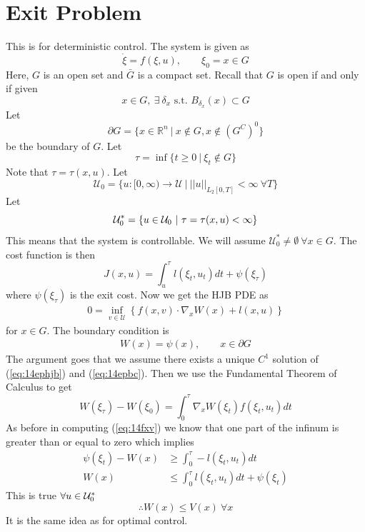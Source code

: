 \section{Exit Problem}
This is for deterministic control. The system is given as
$$\dot{\xi} = f(\xi,u), \qquad \xi_0 = x\in G$$
Here, $G$ is an open set and $\bar{G}$ is a compact set. Recall that $G$ is open if and only if given
$$x\in G, ~\exists~ \delta_x \text{ s.t. } B_{\delta_x}(x)\subset G$$
Let
$$\partial G = \{x\in\mathbb{R}^n ~|~ x\notin G, x\notin(G^C)^0\}$$
be the boundary of $G$. Let
$$\tau = \inf\{t\geq 0 ~|~ \xi_t\notin G\}$$
Note that $\tau=\tau(x,u)$. Let
$$\mathcal{U}_0 = \{u:[0,\infty)\to\mathcal{U} ~|~ ||u||_{L_2[0,T]}<\infty ~\forall T\}$$
Let
$$\mathcal{U}_0^\ast = \{u\in\mathcal{U}_0 ~|~ \tau=\tau(x,u)<\infty\}$$
This means that the system is controllable. We will assume $\mathcal{U}_0^\ast\neq\emptyset ~\forall x\in G$. The cost function is then
$$J(x,u) = \int_u^\tau l(\xi_t,u_t)dt + \psi(\xi_\tau)$$
where $\psi(\xi_\tau)$ is the exit cost. Now we get the HJB PDE as
\begin{align}
\label{eq:14ephjb}
0 = \inf_{v\in\mathcal{U}} \left\lbrace f(x,v)\cdot\nabla_xW(x) + l(x,u) \right\rbrace
\end{align}
for $x\in G$. The boundary condition is
\begin{align}
\label{eq:14epbc}
W(x) = \psi(x), \qquad x\in\partial G
\end{align}
The argument goes that we assume there exists a unique $C^1$ solution of (\ref{eq:14ephjb}) and (\ref{eq:14epbc}). Then we use the Fundamental Theorem of Calculus to get
$$W(\xi_\tau) - W(\xi_0) = \int_0^\tau \nabla_xW(\xi_t)f(\xi_t,u_t)dt$$
As before in computing (\ref{eq:14fxv}) we know that one part of the infinum is greater than or equal to zero which implies
\begin{align*}
\psi(\xi_t) - W(x) &\geq \int_0^\tau -l(\xi_t,u_t)dt \\
W(x) &\leq \int_0^\tau l(\xi_t,u_t)dt + \psi(\xi_t)
\end{align*}
This is true $\forall u\in\mathcal{U}_0^\ast$
$$\therefore W(x)\leq V(x) ~\forall x$$
It is the same idea as for optimal control.

